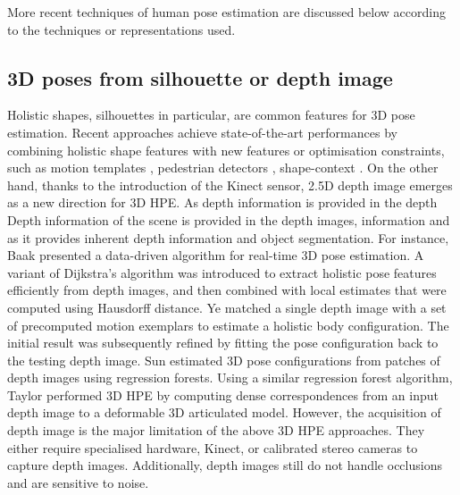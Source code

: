 More recent techniques of human pose estimation are discussed below according to the techniques or representations used.

\subsection{3D poses from silhouette or depth image} 
Holistic shapes, silhouettes in particular, are common features for 3D pose estimation. 
Recent approaches achieve state-of-the-art performances by combining holistic shape features with new features or optimisation constraints, such as motion templates \cite{Rogez2012}, pedestrian detectors \cite{Andriluka2010}, shape-context \cite{Agarwal2006}. 
On the other hand, thanks to the introduction of the Kinect sensor, 2.5D depth image emerges as a new direction for 3D HPE. 
As depth information is provided in the depth 
Depth information of the scene is provided in the depth images, information and as it provides inherent depth information and object segmentation. 
For instance, Baak \etal \cite{Baak2011} presented a data-driven algorithm for real-time 3D pose estimation. A variant of Dijkstra's algorithm was introduced to extract holistic pose features efficiently from depth images, and then combined with local estimates that were computed using Hausdorff distance. Ye \etal \cite{Ye2011} matched a single depth image with a set of precomputed motion exemplars to estimate a holistic body configuration. The initial result was subsequently refined by fitting the pose configuration back to the testing depth image. 
Sun \etal \cite{Sun2012} estimated 3D pose configurations from patches of depth images using regression forests.  
Using a similar regression forest algorithm, Taylor \etal \cite{Taylor2012} performed 3D HPE by computing dense correspondences from an input depth image to a deformable 3D articulated model.  
However, the acquisition of depth image is the major limitation of the above 3D HPE approaches. They either require specialised hardware, \eg Kinect, or calibrated stereo cameras to capture depth images. Additionally, depth images still do not handle occlusions and are sensitive to noise. 


